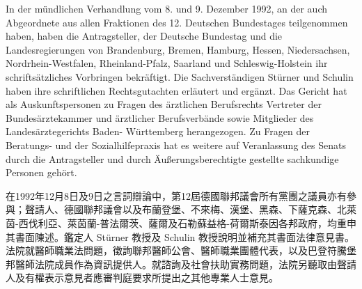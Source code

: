 \documentclass[12pt]{article}
\begin{document}

\begin{sourcepara}[title={原文C.35}]
In der mündlichen Verhandlung vom 8. und 9. Dezember 1992, an der auch Abgeordnete aus allen Fraktionen des 12. Deutschen Bundestages teilgenommen haben, haben die Antragsteller, der Deutsche Bundestag und die Landesregierungen von Brandenburg, Bremen, Hamburg, Hessen, Niedersachsen, Nordrhein-Westfalen, Rheinland-Pfalz, Saarland und Schleswig-Holstein ihr schriftsätzliches Vorbringen bekräftigt. Die Sachverständigen \abbrProf{} \abbrDr{} Stürner und \abbrProf{} \abbrDr{} Schulin haben ihre schriftlichen Rechtsgutachten erläutert und ergänzt. Das Gericht hat als Auskunftspersonen zu Fragen des ärztlichen Berufsrechts Vertreter der Bundesärztekammer und ärztlicher Berufsverbände sowie Mitglieder des Landesärztegerichts Baden- Württemberg herangezogen. Zu Fragen der Beratungs- und der Sozialhilfepraxis hat es weitere auf Veranlassung des Senats durch die Antragsteller und durch Äußerungsberechtigte gestellte sachkundige Personen gehört.
\end{sourcepara}
\begin{transpara}
在1992年12月8日及9日之言詞辯論中，第12屆德國聯邦議會所有黨團之議員亦有參與；聲請人、德國聯邦議會以及布蘭登堡、不來梅、漢堡、黑森、下薩克森、北萊茵-西伐利亞、萊茵蘭-普法爾茨、薩爾及石勒蘇益格-荷爾斯泰因各邦政府，均重申其書面陳述。鑑定人 Stürner 教授及 Schulin 教授說明並補充其書面法律意見書。法院就醫師職業法問題，徵詢聯邦醫師公會、醫師職業團體代表，以及巴登符騰堡邦醫師法院成員作為資訊提供人。就諮詢及社會扶助實務問題，法院另聽取由聲請人及有權表示意見者應審判庭要求所提出之其他專業人士意見。
\end{transpara}


\end{document}
